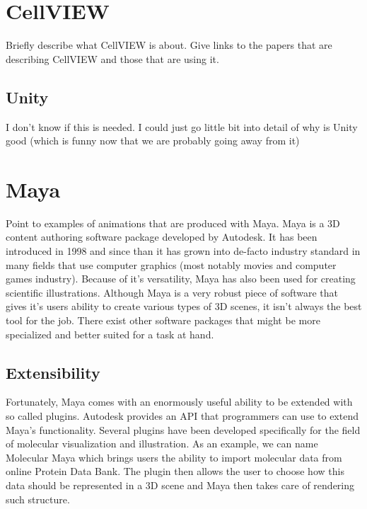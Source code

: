 \documentclass[
  digital, %
  table,   %
  lof,     %
  lot,     %
]{fithesis3}
\begin{document}
\section{CellVIEW}
Briefly describe what CellVIEW is about. Give links to the papers that are describing CellVIEW and those that are using it.
\subsection{Unity}
I don't know if this is needed. I could just go little bit into detail of why is Unity good (which is funny now that we are probably going away from it)
\section{Maya}
Point to examples of animations that are produced with Maya.
Maya is a 3D content authoring software package developed by Autodesk. It has been introduced in 1998 and since than it has grown into de-facto industry standard in many fields that use computer graphics (most notably movies and computer games industry). Because of it's versatility, Maya has also been used for creating scientific illustrations.
Although Maya is a very robust piece of software that gives it's users ability to create various types of 3D scenes, it isn't always the best tool for the job. There exist other software packages that might be more specialized and better suited for a task at hand.
\subsection{Extensibility}
Fortunately, Maya comes with an enormously useful ability to be extended with so called plugins. Autodesk provides an API that programmers can use to extend Maya's functionality.
Several plugins have been developed specifically for the field of molecular visualization and illustration. As an example, we can name Molecular Maya which brings users the ability to import molecular data from online Protein Data Bank. The plugin then allows the user to choose how this data should be represented in a 3D scene and Maya then takes care of rendering such structure.
\end{document}
